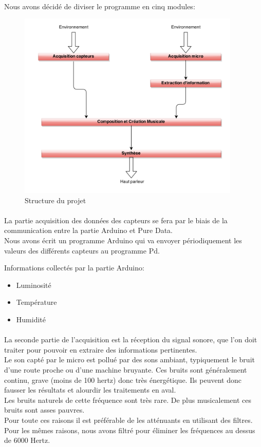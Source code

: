 \documentclass[a4paper, titlepage, oneside, 12pt]{article}%
\begin{document}
\paragraph{}
Nous avons décidé de diviser le programme en cinq modules:
\begin{figure}[H]
  \centering
  \includegraphics[width=400px]{structprojet.jpg}
  \caption{Structure du projet}
\end{figure}

\paragraph{}
La partie acquisition des données des capteurs se fera par le biais de la communication entre la partie Arduino et Pure Data.\\
Nous avons écrit un programme Arduino qui va envoyer périodiquement les valeurs des différents capteurs au programme Pd.

Informations collectés par la partie Arduino:
\begin{itemize}
\item Luminosité
\item Température
\item Humidité
\end{itemize}

\paragraph{}
La seconde partie de l'acquisition est la réception du signal sonore, que l'on doit traiter pour pouvoir en extraire des informations pertinentes.\\
Le son capté par le micro est pollué par des sons ambiant, typiquement le bruit d'une route proche ou d'une machine bruyante. Ces bruits sont généralement continu, grave (moins  de 100 hertz) donc très énergétique. Ils peuvent donc fausser les résultats  et alourdir les traitements en aval.\\
Les bruits naturels de cette fréquence sont très rare. De plus musicalement ces bruits sont asses pauvres.\\
Pour toute ces raisons il est préférable de les atténuants en utilisant des filtres.\\
Pour les mêmes raisons, nous avons filtré pour éliminer les fréquences au dessus de 6000 Hertz.
\end{document}
